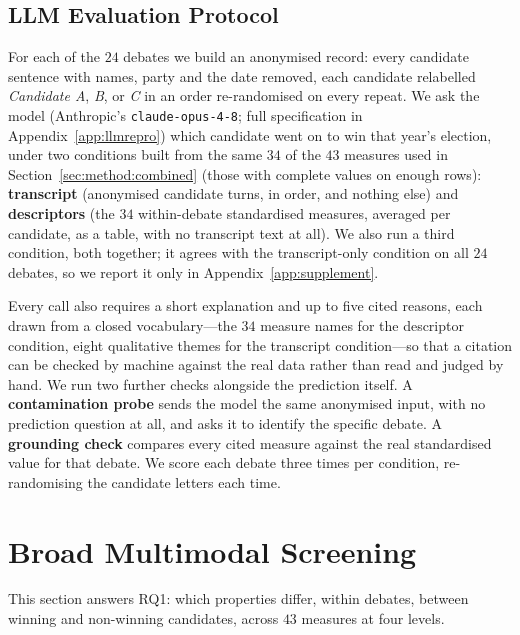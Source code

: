\documentclass[journal]{IEEEtran}
\begin{document}
\subsection{LLM Evaluation Protocol}
\label{sec:method:llmprotocol}

For each of the $24$ debates we build an anonymised record: every candidate
sentence with names, party and the date removed, each candidate relabelled
\emph{Candidate A}, \emph{B}, or \emph{C} in an order re-randomised on every
repeat. We ask the model (Anthropic's \texttt{claude-opus-4-8}; full
specification in Appendix~\ref{app:llmrepro}) which candidate went on to win
that year's election, under two conditions built from the same $34$ of the
$43$ measures used in Section~\ref{sec:method:combined} (those with complete
values on enough rows): \textbf{transcript} (anonymised candidate turns, in
order, and nothing else) and \textbf{descriptors} (the $34$ within-debate
standardised measures, averaged per candidate, as a table, with no
transcript text at all). We also run a third condition, both together; it
agrees with the transcript-only condition on all $24$ debates, so we report
it only in Appendix~\ref{app:supplement}.

Every call also requires a short explanation and up to five cited reasons,
each drawn from a closed vocabulary---the $34$ measure names for the
descriptor condition, eight qualitative themes for the transcript
condition---so that a citation can be checked by machine against the real
data rather than read and judged by hand. We run two further checks
alongside the prediction itself. A \textbf{contamination probe} sends the
model the same anonymised input, with no prediction question at all, and
asks it to identify the specific debate. A \textbf{grounding check} compares
every cited measure against the real standardised value for that debate. We
score each debate three times per condition, re-randomising the candidate
letters each time.

\section{Broad Multimodal Screening}
\label{sec:method:screen}

This section answers RQ1: which properties differ, within debates, between
winning and non-winning candidates, across $43$ measures at four levels.
\end{document}
